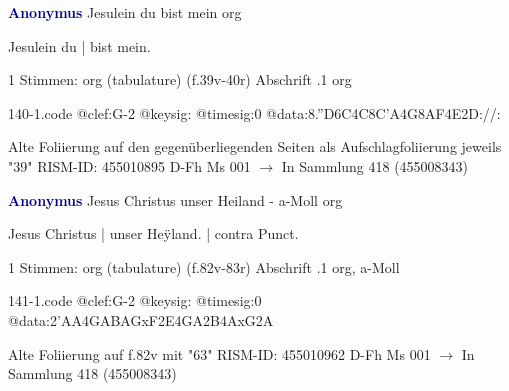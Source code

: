 \documentclass[twocolumn]{book}
\begin{document}
\newline \par \vspace{7pt} \textcolor{darkblue}{\textbf{Anonymus  }}
\newline Jesulein du bist mein
\newline org
\newline \begin{itshape}[f.39v, at left:] Jesulein du | bist mein.\end{itshape} 
\newline \textcolor{darkblue}{}  1 Stimmen: org (tabulature)  (f.39v-40r)
\newline Abschrift
.1  org  
\begin{filecontents*}{140-1.code}
@clef:G-2
@keysig:
@timesig:0
@data:8.''D6C4C{8C'A}4G{8AF}4E2D://:
\end{filecontents*}
\newline
%
\newline Alte Foliierung auf den gegenüberliegenden Seiten als Aufschlagfoliierung jeweils "39"
\newline RISM-ID: 455010895
\newline D-Fh  Ms 001
\newline $\rightarrow$ In Sammlung 418 (455008343)
      
\newline \par \vspace{7pt} \textcolor{darkblue}{\textbf{Anonymus  }}
\newline Jesus Christus unser Heiland - a-Moll
\newline org
\newline \begin{itshape}[f.82v, at left:] Jesus Christus | unser Heÿland. | contra Punct.\end{itshape} 
\newline \textcolor{darkblue}{}  1 Stimmen: org (tabulature)  (f.82v-83r)
\newline Abschrift
.1  org, a-Moll  
\begin{filecontents*}{141-1.code}
@clef:G-2
@keysig:
@timesig:0
@data:2'AA4GABAGxF2E4GA2B4AxG2A
\end{filecontents*}
\newline
%
\newline Alte Foliierung auf f.82v mit "63"
\newline RISM-ID: 455010962
\newline D-Fh  Ms 001
\newline $\rightarrow$ In Sammlung 418 (455008343)
      
\end{document}
